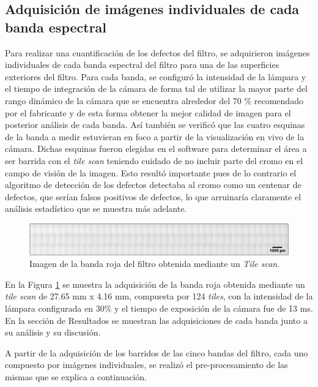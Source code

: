 \singlespacing
\subsection{Adquisición de imágenes individuales de cada banda espectral}

\hspace{0.5cm}Para realizar una cuantificación de los defectos del filtro, se adquirieron imágenes individuales de cada banda espectral del filtro para una de las superficies exteriores del filtro. Para cada banda, se configuró la intensidad de la lámpara y el tiempo de integración de la cámara de forma tal de utilizar la mayor parte del rango dinámico de la cámara que se encuentra alrededor del 70 \% recomendado por el fabricante y de esta forma obtener la mejor calidad de imagen para el posterior análisis de cada banda. Así también se verificó que las cuatro esquinas de la banda a medir estuvieran en foco a partir de la visualización en vivo de la cámara. Dichas esquinas fueron elegidas en el software para determinar el área a ser barrida con el \textit{tile scan} teniendo cuidado de no incluir parte del cromo en el campo de visión de la imagen. Esto resultó importante pues de lo contrario el algoritmo de detección de los defectos detectaba al cromo como un centenar de defectos, que serían falsos positivos de defectos, lo que arruinaría claramente el análisis estadístico que se muestra más adelante.

\begin{figure}[H]
	\centering
	\includegraphics[width=1.0\textwidth]{Figs/defectosZEISS/tilebandaroja.png}
	\caption{Imagen de la banda roja del filtro obtenida mediante un \textit{Tile scan}.}
	\label{fig:tilebandaroja}
\end{figure}

En la Figura \ref{fig:tilebandaroja} se muestra la adquisición de la banda roja obtenida mediante un \textit{tile scan} de 27.65 mm x 4.16 mm, compuesta por 124 \textit{tiles}, con la intensidad de la lámpara configurada en 30\% y el tiempo de exposición de la cámara fue de 13 ms. En la sección de Resultados se muestran las adquisiciones de cada banda junto a su análisis y su discusión.

A partir de la adquisición de los barridos de las cinco bandas del filtro, cada uno compuesto por imágenes individuales, se realizó el pre-procesamiento de las mismas que se explica a continuación.
	



